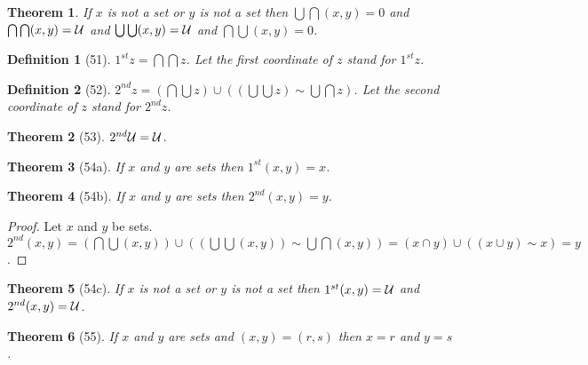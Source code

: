 \documentclass{scrartcl}
\newtheorem*{theorem}{Theorem}
\newtheorem*{definition}{Definition}
\newcommand{\op}[2]{({#1},{#2})}
\begin{document}
\begin{theorem} If $x$ is not a set or $y$ is not a set then
  $\bigcup \bigcap \op{x}{y} = 0$ and
  $\bigcap \bigcap \op{x}{y} = {\cal U}$ and
  $\bigcup \bigcup \op{x}{y} = {\cal U}$ and
  $\bigcap \bigcup \op{x}{y} = 0$.
\end{theorem}

\begin{definition}[51] $1^{st} z = \bigcap \bigcap z$.
Let the \emph{first coordinate} of $z$ stand for $1^{st} z$.
\end{definition}

\begin{definition}[52] $2^{nd} z = 
(\bigcap \bigcup z) \cup ((\bigcup \bigcup z) \sim \bigcup \bigcap z)$. 
Let the \emph{second coordinate} of $z$ stand for $2^{nd} z$.
\end{definition}

\begin{theorem}[53] $2^{nd} {\cal U} = {\cal U}$.
\end{theorem}

\begin{theorem}[54a] If $x$ and $y$ are sets then $1^{st} \op{x}{y} = x$.
\end{theorem}
\begin{theorem}[54b] If $x$ and $y$ are sets then $2^{nd} \op{x}{y} = y$.
\end{theorem}
\begin{proof} Let $x$ and $y$ be sets.
$2^{nd} \op{x}{y} = (\bigcap \bigcup \op{x}{y}) \cup 
((\bigcup \bigcup \op{x}{y}) \sim \bigcup \bigcap \op{x}{y})
= (x \cap y) \cup ((x \cup y) \sim x)
= y$.
\end{proof}
\begin{theorem}[54c] If $x$ is not a set or $y$ is not a set then
$1^{st} \op{x}{y} = {\cal U}$ and $2^{nd} \op{x}{y} = {\cal U}$.
\end{theorem}

\begin{theorem}[55] If $x$ and $y$ are sets and $\op{x}{y}=\op{r}{s}$ then
$x = r$ and $y = s$.
\end{theorem}
\end{document}
